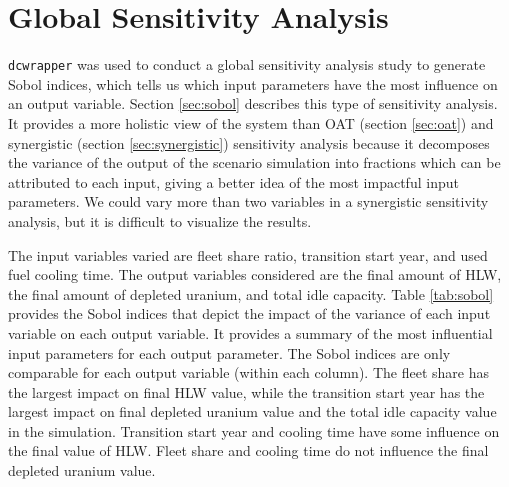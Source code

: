 \section{Global Sensitivity Analysis}
\texttt{dcwrapper} was used to conduct a global sensitivity 
analysis study to generate Sobol indices, which tells us which 
input parameters have the most influence on an output variable.
Section \ref{sec:sobol} describes this type of sensitivity 
analysis.
It provides a more holistic view of the system 
than OAT (section \ref{sec:oat}) and 
synergistic (section \ref{sec:synergistic}) sensitivity 
analysis because it decomposes the variance of the 
output of the scenario simulation into fractions which can be 
attributed to each input, giving a better idea of the
most impactful input parameters. 
We could vary more than two variables in a synergistic 
sensitivity analysis, but it is difficult to visualize the results.

The input variables varied are fleet share ratio, 
transition start year, and used fuel cooling time.
The output variables considered are the final amount of HLW, 
the final amount of depleted uranium, and total idle capacity. 
Table \ref{tab:sobol} provides the Sobol indices that depict 
the impact of the variance of each input variable on each output 
variable. 
It provides a summary of the most influential input parameters 
for each output parameter. 
The Sobol indices are only comparable for each output variable 
(within each column). 
The fleet share has the largest impact on 
final HLW value, while the transition start year has the largest 
impact on final depleted uranium value and the total idle 
capacity value in the simulation. 
Transition start year and cooling time have some influence on 
the final value of HLW. 
Fleet share and cooling time do not influence the final 
depleted uranium value. 
    
